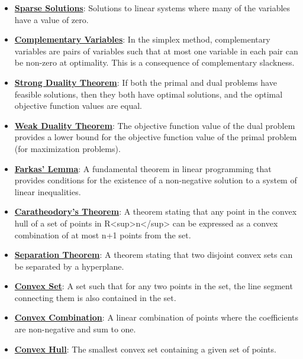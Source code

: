 \documentclass{article}%
\begin{document}
\begin{itemize}[leftmargin=*]
\item \href{https://www.math.purdue.edu/~yipn/421/2024-12-03-Duality.pdf#page=9}{\textbf{Sparse Solutions}}: Solutions to linear systems where many of the variables have a value of zero. %
\item \href{https://www.math.purdue.edu/~yipn/421/2024-12-03-Duality.pdf#page=2}{\textbf{Complementary Variables}}: In the simplex method, complementary variables are pairs of variables such that at most one variable in each pair can be non-zero at optimality. This is a consequence of complementary slackness. %
\item \href{https://www.math.purdue.edu/~yipn/421/2024-12-03-Duality.pdf#page=1}{\textbf{Strong Duality Theorem}}: If both the primal and dual problems have feasible solutions, then they both have optimal solutions, and the optimal objective function values are equal. %
\item \href{https://www.math.purdue.edu/~yipn/421/2024-12-03-Duality.pdf#page=1}{\textbf{Weak Duality Theorem}}: The objective function value of the dual problem provides a lower bound for the objective function value of the primal problem (for maximization problems). %
\item \href{https://www.math.purdue.edu/~yipn/421/2024-12-03-Duality.pdf#page=1}{\textbf{Farkas' Lemma}}: A fundamental theorem in linear programming that provides conditions for the existence of a non-negative solution to a system of linear inequalities. %
\item \href{https://www.math.purdue.edu/~yipn/421/2024-12-03-Duality.pdf#page=1}{\textbf{Caratheodory's Theorem}}: A theorem stating that any point in the convex hull of a set of points in R<sup>n</sup> can be expressed as a convex combination of at most n+1 points from the set. %
\item \href{https://www.math.purdue.edu/~yipn/421/2024-12-03-Duality.pdf#page=1}{\textbf{Separation Theorem}}: A theorem stating that two disjoint convex sets can be separated by a hyperplane. %
\item \href{https://www.math.purdue.edu/~yipn/421/2024-12-03-Duality.pdf#page=1}{\textbf{Convex Set}}: A set such that for any two points in the set, the line segment connecting them is also contained in the set. %
\item \href{https://www.math.purdue.edu/~yipn/421/2024-12-03-Duality.pdf#page=1}{\textbf{Convex Combination}}: A linear combination of points where the coefficients are non-negative and sum to one. %
\item \href{https://www.math.purdue.edu/~yipn/421/2024-12-03-Duality.pdf#page=1}{\textbf{Convex Hull}}: The smallest convex set containing a given set of points. %

\end{itemize}
\end{document}
